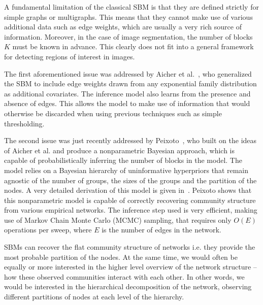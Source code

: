 \documentclass[conference]{IEEEtran}
\begin{document}
A fundamental limitation of the classical SBM is that they are defined strictly for simple graphs or multigraphs. This means that they cannot make use of various additional data such as edge weights, which are usually a very rich source of information. Moreover, in the case of image segmentation, the number of blocks $K$ must be known in advance. This clearly does not fit into a general framework for detecting regions of interest in images.

The first aforementioned issue was addressed by Aicher et al.~\cite{aicher2014learning}, who generalized the SBM to include edge weights drawn from any exponential family distribution  as additional covariates. The inference model also learns from the presence and absence of edges. This allows the model to make use of information that would otherwise be discarded when using previous techniques such as simple thresholding.

The second issue was just recently addressed by Peixoto~\cite{peixoto2017nonparametric}, who built on the ideas of Aicher et al. and produce a nonparametric Bayesian approach, which is capable of probabilistically inferring the number of blocks in the model. The model relies on a Bayesian hierarchy of uninformative hyperpriors that remain agnostic of the number of groups, the sizes of the groups and the partition of the nodes. A very detailed derivation of this model is given in~\cite{peixoto2017bayesian}. Peixoto shows that this nonparametric model is capable of correctly recovering community structure from various empirical networks. The inference step used is very efficient, making use of Markov Chain Monte Carlo (MCMC) sampling, that requires only $O(E)$ operations per sweep, where $E$ is the number of edges in the network.

SBMs can recover the flat community structure of networks i.e. they provide the most probable  partition of the nodes. At the same time, we would often be equally or more interested in the higher level overview of the network structure -- how these observed communities interact with each other. In other words, we would be interested in the hierarchical decomposition of the network, observing different partitions of nodes at each level of the hierarchy.
\end{document}
